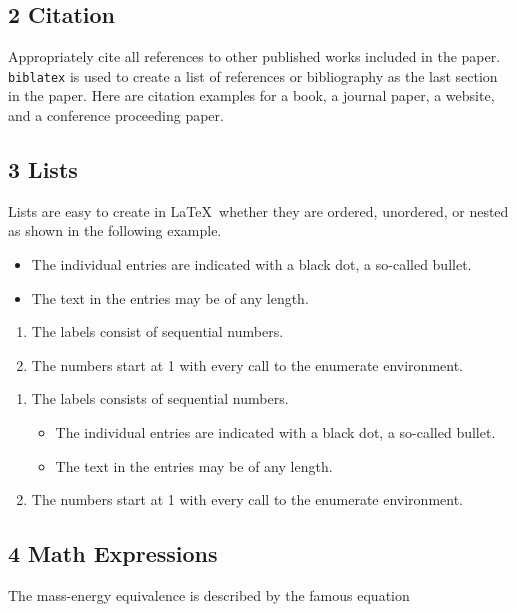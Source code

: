 \documentclass[10pt]{article}
\begin{document}
\subsection*{2 Citation}
Appropriately cite all references to other published works included in the paper. \texttt{biblatex} is used to create a list of references or bibliography as the last section in the paper. Here are citation examples for a book\cite{latexcompanion}, a journal paper\cite{einstein}, a website\cite{knuthwebsite}, and a conference proceeding paper\cite{maurer}.

\subsection*{3 Lists}
Lists are easy to create in  \LaTeX\ whether they are ordered, unordered, or nested as shown in the following example.

\begin{itemize}[noitemsep]
  \item The individual entries are indicated with a black dot, a so-called bullet.
  \item The text in the entries may be of any length.
\end{itemize}

\begin{enumerate}[noitemsep]
  \item The labels consist of sequential numbers.
  \item The numbers start at 1 with every call to the enumerate environment.
\end{enumerate}

\begin{enumerate}[noitemsep]
   \item The labels consists of sequential numbers.
   \begin{itemize}[noitemsep]
     \item The individual entries are indicated with a black dot, a so-called bullet.
     \item The text in the entries may be of any length.
   \end{itemize}
   \item The numbers start at 1 with every call to the enumerate environment.
\end{enumerate}

\subsection*{4 Math Expressions}
The mass-energy equivalence is described by the famous equation
\end{document}
